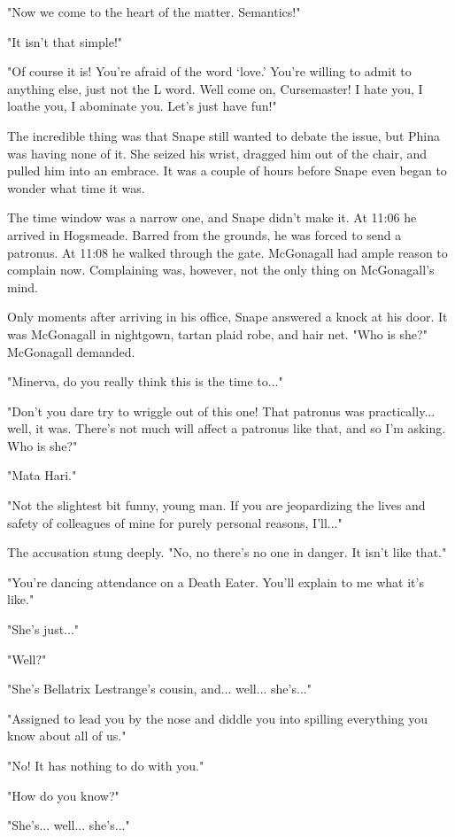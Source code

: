 \documentclass[a4paper,11pt]{article}
\begin{document}
"Now we come to the heart of the matter. Semantics!"

"It isn't that simple!"

"Of course it is! You're afraid of the word `love.' You're willing to admit to anything else, just not the L word. Well come on, Cursemaster! I hate you, I loathe you, I abominate you. Let's just have fun!"

The incredible thing was that Snape still wanted to debate the issue, but Phina was having none of it. She seized his wrist, dragged him out of the chair, and pulled him into an embrace. It was a couple of hours before Snape even began to wonder what time it was.

The time window was a narrow one, and Snape didn't make it. At 11:06 he arrived in Hogsmeade. Barred from the grounds, he was forced to send a patronus. At 11:08 he walked through the gate. McGonagall had ample reason to complain now. Complaining was, however, not the only thing on McGonagall's mind.

Only moments after arriving in his office, Snape answered a knock at his door. It was McGonagall in nightgown, tartan plaid robe, and hair net. "Who is she?" McGonagall demanded.

"Minerva, do you really think this is the time to..."

"Don't you dare try to wriggle out of this one! That patronus was practically... well, it was. There's not much will affect a patronus like that, and so I'm asking. Who is she?"

"Mata Hari."

"Not the slightest bit funny, young man. If you are jeopardizing the lives and safety of colleagues of mine for purely personal reasons, I'll..."

The accusation stung deeply. "No, no there's no one in danger. It isn't like that."

"You're dancing attendance on a Death Eater. You'll explain to me what it's like."

"She's just..."

"Well?"

"She's Bellatrix Lestrange's cousin, and... well... she's..."

"Assigned to lead you by the nose and diddle you into spilling everything you know about all of us."

"No! It has nothing to do with you."

"How do you know?"

"She's... well... she's..."
\end{document}
